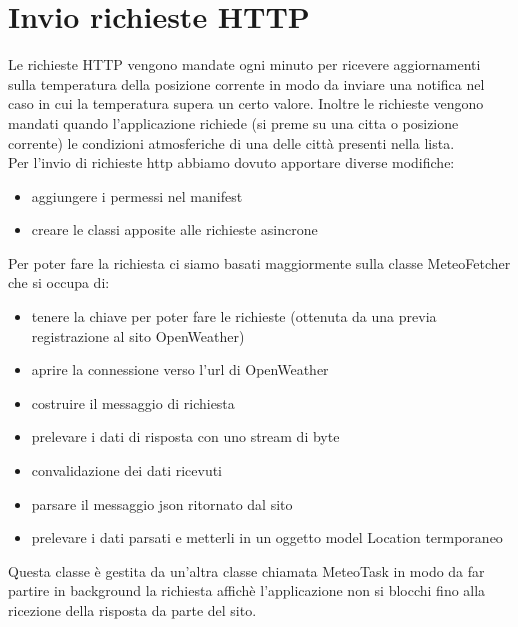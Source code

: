 \documentclass[twoside]{supsistudent}
\begin{document}
\section{Invio richieste HTTP}
Le richieste HTTP vengono mandate ogni minuto per ricevere aggiornamenti sulla temperatura della posizione corrente in modo da inviare una notifica nel caso in cui
la temperatura supera un certo valore. Inoltre le richieste vengono mandati quando l'applicazione richiede (si preme su una citta o posizione corrente) le condizioni
atmosferiche di una delle città presenti nella lista.\\
Per l'invio di richieste http abbiamo dovuto apportare diverse modifiche:
\begin{itemize}
  \item aggiungere i permessi nel manifest
  \item creare le classi apposite alle richieste asincrone
\end{itemize}
Per poter fare la richiesta ci siamo basati maggiormente sulla classe MeteoFetcher che si occupa di:
\begin{itemize}
  \item tenere la chiave per poter fare le richieste (ottenuta da una previa registrazione al sito OpenWeather)
  \item aprire la connessione verso l'url di OpenWeather
  \item costruire il messaggio di richiesta
  \item prelevare i dati di risposta con uno stream di byte
  \item convalidazione dei dati ricevuti
  \item parsare il messaggio json ritornato dal sito
  \item prelevare i dati parsati e metterli in un oggetto model Location termporaneo
\end{itemize}

Questa classe è gestita da un'altra classe chiamata MeteoTask in modo da far partire in background la richiesta affichè l'applicazione
non si blocchi fino alla ricezione della risposta da parte del sito.
\end{document}
